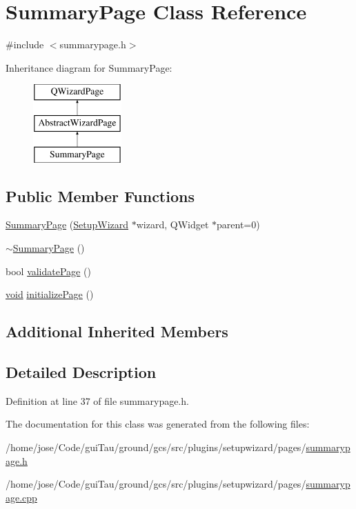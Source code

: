 \hypertarget{class_summary_page}{\section{Summary\-Page Class Reference}
\label{class_summary_page}
}


{\ttfamily \#include $<$summarypage.\-h$>$}

Inheritance diagram for Summary\-Page\-:\begin{figure}[H]
\begin{center}
\leavevmode
\includegraphics[height=3.000000cm]{class_summary_page}
\end{center}
\end{figure}
\subsection*{Public Member Functions}
\begin{DoxyCompactItemize}
\item 
\hyperlink{group___summary_page_gac0ed5703bf2053761d8269cc674138ed}{Summary\-Page} (\hyperlink{class_setup_wizard}{Setup\-Wizard} $\ast$wizard, Q\-Widget $\ast$parent=0)
\item 
\hyperlink{group___summary_page_ga8c25c96270b9721692e6931ea63f42a2}{$\sim$\-Summary\-Page} ()
\item 
bool \hyperlink{group___summary_page_ga4ae44b0f8e7ea5786172b19103d9a1af}{validate\-Page} ()
\item 
\hyperlink{group___u_a_v_objects_plugin_ga444cf2ff3f0ecbe028adce838d373f5c}{void} \hyperlink{group___summary_page_ga78bc91ccb12e3cce67b078982da92ac0}{initialize\-Page} ()
\end{DoxyCompactItemize}
\subsection*{Additional Inherited Members}


\subsection{Detailed Description}


Definition at line 37 of file summarypage.\-h.



The documentation for this class was generated from the following files\-:\begin{DoxyCompactItemize}
\item 
/home/jose/\-Code/gui\-Tau/ground/gcs/src/plugins/setupwizard/pages/\hyperlink{summarypage_8h}{summarypage.\-h}\item 
/home/jose/\-Code/gui\-Tau/ground/gcs/src/plugins/setupwizard/pages/\hyperlink{summarypage_8cpp}{summarypage.\-cpp}\end{DoxyCompactItemize}
